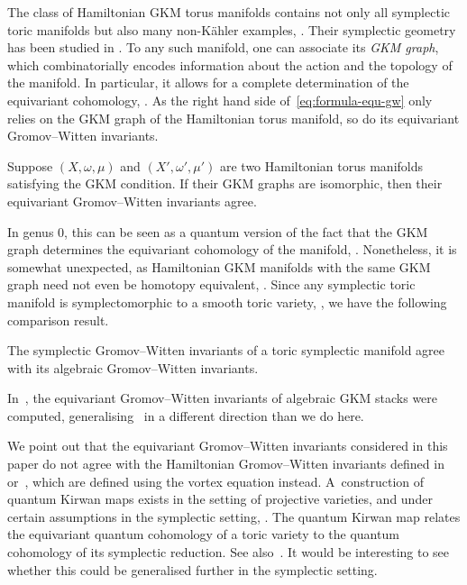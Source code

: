 \documentclass[AHL,Unicode,longabstracts]{cedram}
\begin{document}
The class of Hamiltonian GKM torus manifolds contains not only all symplectic toric manifolds but also many non-K\"ahler examples, \cite{GKZ20,GKZ23,Tol98,Wo98}. Their symplectic geometry has been studied in \cite{GKZ20b,GKZ22,GZ00,GZ01}. To any such manifold, one can associate its \emph{GKM graph}, which combinatorially encodes information about the action and the topology of the manifold. In particular, it allows for a complete determination of the equivariant cohomology, \cite[Proposition~2.30]{GKZ22b}. As the right hand side of~\eqref{eq:formula-equ-gw} only relies on the GKM graph of the Hamiltonian torus manifold, so do its equivariant Gromov--Witten invariants.

\begin{theo}
Suppose $(X,\omega,\mu)$ and $(X',\omega',\mu')$ are two Hamiltonian torus manifolds satisfying the GKM condition. If their GKM graphs are isomorphic, then their equivariant Gromov--Witten invariants agree.
\end{theo}

In genus $0$, this can be seen as a quantum version of the fact that the GKM graph determines the equivariant cohomology of the manifold, \cite[Proposition~2.30]{GKZ22b}. Nonetheless, it is somewhat unexpected, as Hamiltonian GKM manifolds with the same GKM graph need not even be homotopy equivalent, \cite[Theorem~1.3]{GKZ22}. Since any symplectic toric manifold is symplectomorphic to a smooth toric variety, \cite[Theorem~2.1]{Del88}, we have the following comparison result.

\begin{coro}
The symplectic Gromov--Witten invariants of a toric symplectic manifold agree with its algebraic Gromov--Witten invariants.
\end{coro}

In~\cite{LiSh17}, the equivariant Gromov--Witten invariants of algebraic GKM stacks were computed, generalising~\cite{Liu13} in a different direction than we do here.

We point out that the equivariant Gromov--Witten invariants considered in this paper do not agree with the Hamiltonian Gromov--Witten invariants defined in \cite{CGMS02,Mir03} or~\cite{TX17}, which are defined using the vortex equation instead. A~construction of quantum Kirwan maps exists in the setting of projective varieties, \cite{GoWo22} and under certain assumptions in the symplectic setting, \cite{Xu24}. The quantum Kirwan map relates the equivariant quantum cohomology of a toric variety to the quantum cohomology of its symplectic reduction. See also~\cite{NWZ14}. It would be interesting to see whether this could be generalised further in the symplectic setting.
\end{document}
